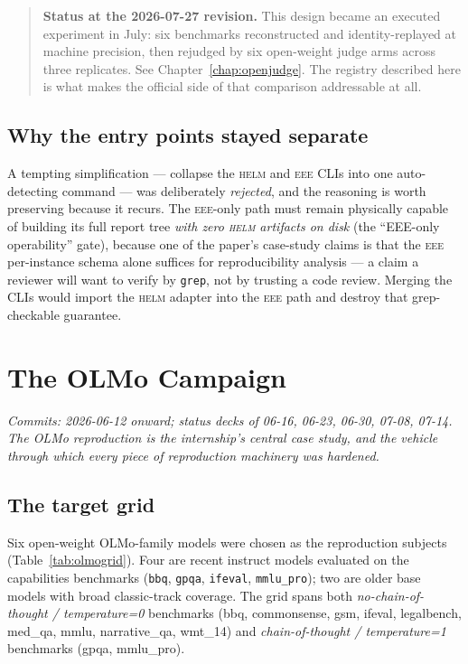 \documentclass[11pt]{report}
\newcommand{\eeeshort}{\textsc{eee}\xspace}
\newcommand{\code}[1]{\texttt{#1}}
\newcommand{\evidencebox}[2]{\begin{quote}\noindent\textbf{#1.} #2\end{quote}}
\begin{document}
\evidencebox{Status at the 2026-07-27 revision}{This design became an executed
experiment in July: six benchmarks reconstructed and identity-replayed at machine
precision, then rejudged by six open-weight judge arms across three replicates. See
Chapter~\ref{chap:openjudge}. The registry described here is what makes the
official side of that comparison addressable at all.}

\section{Why the entry points stayed separate}

A tempting simplification --- collapse the \textsc{helm} and \eeeshort CLIs into
one auto-detecting command --- was deliberately \emph{rejected}, and the reasoning
is worth preserving because it recurs. The \eeeshort-only path must remain
physically capable of building its full report tree \emph{with zero \textsc{helm}
artifacts on disk} (the ``EEE-only operability'' gate), because one of the paper's
case-study claims is that the \eeeshort per-instance schema alone suffices for
reproducibility analysis --- a claim a reviewer will want to verify by
\code{grep}, not by trusting a code review. Merging the CLIs would import the
\textsc{helm} adapter into the \eeeshort path and destroy that grep-checkable
guarantee.

\chapter{The OLMo Campaign}
\label{chap:olmo}

\emph{Commits: 2026-06-12 onward; status decks of 06-16, 06-23, 06-30, 07-08,
07-14. The OLMo reproduction is the internship's central case study, and the
vehicle through which every piece of reproduction machinery was hardened.}

\section{The target grid}

Six open-weight OLMo-family models were chosen as the reproduction subjects
(Table~\ref{tab:olmogrid}). Four are recent instruct models evaluated on the
capabilities benchmarks (\code{bbq}, \code{gpqa}, \code{ifeval}, \code{mmlu\_pro});
two are older base models with broad classic-track coverage. The grid spans both
\emph{no-chain-of-thought / temperature=0} benchmarks (bbq, commonsense, gsm,
ifeval, legalbench, med\_qa, mmlu, narrative\_qa, wmt\_14) and \emph{chain-of-thought
/ temperature=1} benchmarks (gpqa, mmlu\_pro).
\end{document}
